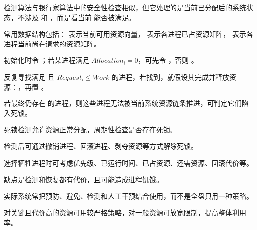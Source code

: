 \begin{points}
  \item 检测算法与银行家算法中的安全性检查相似，但它处理的是当前已分配后的系统状态，不涉及  和 ，而是看当前  能否被满足。
  \item 常用数据结构包括： 表示当前可用资源向量， 表示各进程已占资源矩阵， 表示各进程当前尚在请求的资源矩阵。
  \item 初始化时令 ；若某进程满足 $Allocation_i=0$，可先令 ，否则 。
  \item 反复寻找满足  且 $Request_i \le Work$ 的进程，若找到，就假设其完成并释放资源：，再置 。
  \item 若最终仍存在  的进程，则这些进程无法被当前系统资源链条推进，可判定它们陷入死锁。
\end{points}


\begin{points}
  \item 死锁检测允许资源正常分配，周期性检查是否存在死锁。
  \item 检测后可通过撤销进程、回滚进程、剥夺资源等方式解除死锁。
  \item 选择牺牲进程时可考虑优先级、已运行时间、已占资源、还需资源、回滚代价等。
  \item 缺点是检测和恢复都有代价，且可能造成进程饥饿。
\end{points}


\begin{points}
  \item 实际系统常把预防、避免、检测和人工干预结合使用，而不是全盘只用一种策略。
  \item 对关键且代价高的资源可用较严格策略，对一般资源可放宽限制，提高整体利用率。
\end{points}
